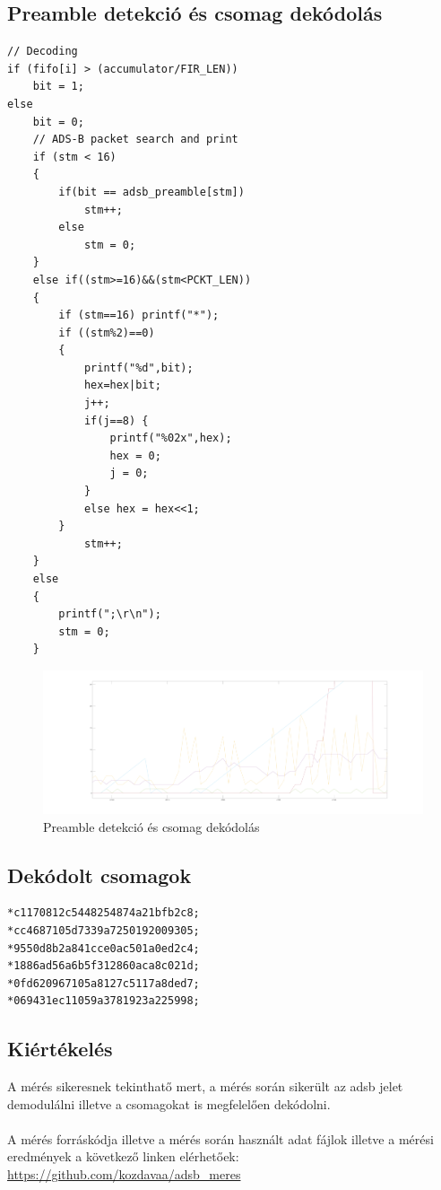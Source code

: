 \newpage
\subsection{Preamble detekció és csomag dekódolás}
\begin{lstlisting}
// Decoding
if (fifo[i] > (accumulator/FIR_LEN))
    bit = 1;
else
	bit = 0;
	// ADS-B packet search and print
	if (stm < 16)
	{
		if(bit == adsb_preamble[stm])
			stm++;
        else
			stm = 0;
    }
	else if((stm>=16)&&(stm<PCKT_LEN))
	{
		if (stm==16) printf("*");
		if ((stm%2)==0)
		{
			printf("%d",bit);
			hex=hex|bit;
			j++;
			if(j==8) {
                printf("%02x",hex);
				hex = 0;
				j = 0;
			}
			else hex = hex<<1;
		}
            stm++;
	}
	else
	{
		printf(";\r\n");
		stm = 0;
	}
\end{lstlisting}
\begin{figure}[h]
    \centering
    \includegraphics[width=1\textwidth]{../meres/result/preambledet_datacalc.png}
    \caption{Preamble detekció és csomag dekódolás}
    \label{fig:deceison}
\end{figure}

\newpage
\subsection{Dekódolt csomagok}
\begin{lstlisting}
*c1170812c5448254874a21bfb2c8;
*cc4687105d7339a7250192009305;
*9550d8b2a841cce0ac501a0ed2c4;
*1886ad56a6b5f312860aca8c021d;
*0fd620967105a8127c5117a8ded7;
*069431ec11059a3781923a225998;
\end{lstlisting}

\subsection{Kiértékelés}
A mérés sikeresnek tekinthatő mert, a mérés során sikerült az adsb jelet demodulálni illetve a csomagokat is megfelelően dekódolni.\\
\\
A mérés forráskódja illetve a mérés során használt adat fájlok illetve a mérési eredmények a következő linken elérhetőek: \url{https://github.com/kozdavaa/adsb_meres}
